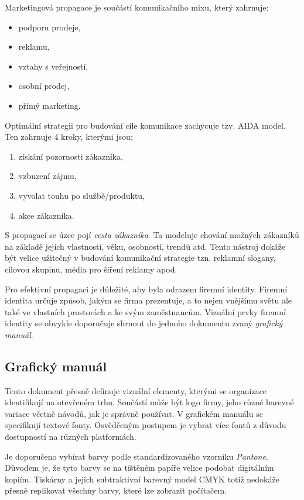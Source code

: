         Marketingová propagace je součástí komunikačního mixu, který zahrnuje:
        \begin{itemize}
            \item podporu prodeje,
            \item reklamu,
            \item vztahy s veřejností,
            \item osobní prodej,
            \item přímý marketing.
        \end{itemize}
        Optimální strategii pro budování cíle komunikace zachycuje tzv. AIDA model. Ten zahrnuje 4 kroky, kterými jsou:
        \begin{enumerate}
            \item získání pozornosti zákazníka,
            \item vzbuzení zájmu,
            \item vyvolat touhu po službě/produktu,
            \item akce zákazníka.
        \end{enumerate}
    S propagací se úzce pojí \emph{cesta zákazníka}. Ta modeluje chování možných zákazníků na základě jejich vlastností,
    věku, osobností, trendů atd. Tento nástroj dokáže být velice užitečný v budování komunikační strategie tzn. reklamní slogany,
    cílovou skupinu, média pro šíření reklamy apod. 

    Pro efektivní propagaci je důležité, aby byla odrazem firemní identity. Firemní identita určuje způsob, jakým se firma prezentuje,
    a to nejen vnějšímu světu ale také ve vlastních prostorách a ke svým zaměstnancům. Vizuální prvky firemní identity se obvykle doporučuje shrnout do
    jednoho dokumentu zvaný \emph{grafický manuál}.

    \subsection{Grafický manuál}\label{ssec:marketing-graphic-manual}
    Tento dokument přesně definuje vizuální elementy, kterými se organizace identifikují na otevřeném trhu.
    Součástí může být logo firmy, jeho různé barevné variace včetně návodů, jak je správně používat. V grafickém manuálu se specifikují textové fonty.
    Osvědčeným postupem je vybrat více fontů z důvodu dostupností na různých platformách. 

    Je doporučeno vybírat barvy podle standardizovaného vzorníku \emph{Pantone}. Důvodem je,
    že tyto barvy se na tištěném papíře velice podobat digitálním kopiím. Tiskárny a jejich subtraktivní barevný model CMYK totiž nedokáže přesně replikovat
    všechny barvy, které lze zobrazit počítačem. 

